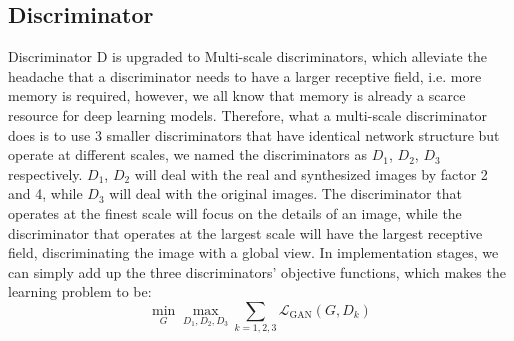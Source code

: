 \subsection{Discriminator}
Discriminator D is upgraded to Multi-scale discriminators, which alleviate the headache that a 
discriminator needs to have a larger receptive field, i.e. more memory is required, however, we 
all know that memory is already a scarce resource for deep learning models. Therefore, what a 
multi-scale discriminator does is to use 3 smaller discriminators that have identical network
structure but operate at different scales, we named the discriminators as $D_{1}$, $D_{2}$, $D_{3}$ 
respectively. $D_{1}$, $D_{2}$ will deal with the real and synthesized images by factor 2 and 4, 
while $D_{3}$ will deal with the original images. The discriminator that operates at the finest 
scale will focus on the details of an image, while the discriminator that operates at the largest 
scale will have the largest receptive field, discriminating the image with a global view. In 
implementation stages, we can simply add up the three discriminators' objective functions, which makes 
the learning problem to be:
$$\min _{G} \max _{D_{1}, D_{2}, D_{3}} \sum_{k=1,2,3} \mathcal{L}_{\mathrm{GAN}}\left(G, D_{k}\right)$$

